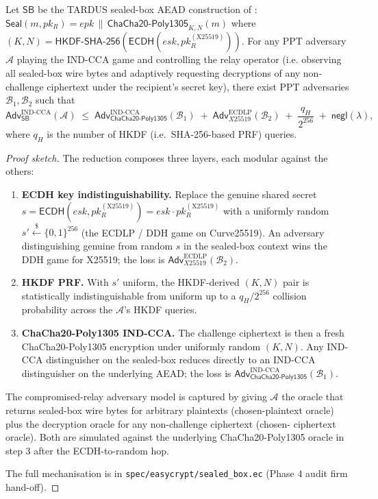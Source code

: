 \begin{theorem}
\label{thm:T7}
Let $\mathsf{SB}$ be the TARDUS sealed-box AEAD construction of
: $\mathsf{Seal}(m, pk_R) = epk \,\|\,
\mathsf{ChaCha20\text{-}Poly1305}_{K,N}(m)$ where
$(K,N) = \mathsf{HKDF\text{-}SHA\text{-}256}(\mathsf{ECDH}(esk, pk_R^{(\mathrm{X25519})}))$.
For any PPT adversary $\mathcal{A}$ playing the IND-CCA game and
controlling the relay operator (i.e. observing all sealed-box wire
bytes and adaptively requesting decryptions of any non-challenge
ciphertext under the recipient's secret key), there exist PPT
adversaries $\mathcal{B}_1, \mathcal{B}_2$ such that
\[
  \mathsf{Adv}^{\mathrm{IND\text{-}CCA}}_{\mathsf{SB}}(\mathcal{A}) \;\leq\;
  \mathsf{Adv}^{\mathrm{IND\text{-}CCA}}_{\mathsf{ChaCha20\text{-}Poly1305}}(\mathcal{B}_1) \;+\;
  \mathsf{Adv}^{\mathrm{ECDLP}}_{X25519}(\mathcal{B}_2) \;+\;
  \frac{q_H}{2^{256}} \;+\; \mathsf{negl}(\lambda),
\]
where $q_H$ is the number of HKDF (i.e.\ SHA-256-based PRF)
queries.
\end{theorem}

\begin{proof}[Proof sketch]
The reduction composes three layers, each modular against the
others:

\begin{enumerate}[leftmargin=2em,itemsep=0pt]
  \item \textbf{ECDH key indistinguishability.}
    Replace the genuine shared secret
    $s = \mathsf{ECDH}(esk, pk_R^{(\mathrm{X25519})}) = esk \cdot pk_R^{(\mathrm{X25519})}$
    with a uniformly random
    $s' \xleftarrow{\$} \{0,1\}^{256}$ (the ECDLP / DDH game on
    Curve25519). An adversary distinguishing genuine from random
    $s$ in the sealed-box context wins the DDH game for X25519;
    the loss is $\mathsf{Adv}^{\mathrm{ECDLP}}_{X25519}(\mathcal{B}_2)$.
  \item \textbf{HKDF PRF.}
    With $s'$ uniform, the HKDF-derived $(K, N)$ pair is
    statistically indistinguishable from uniform up to a
    $q_H / 2^{256}$ collision probability across the
    $\mathcal{A}$'s HKDF queries.
  \item \textbf{ChaCha20-Poly1305 IND-CCA.}
    The challenge ciphertext is then a fresh ChaCha20-Poly1305
    encryption under uniformly random $(K, N)$. Any IND-CCA
    distinguisher on the sealed-box reduces directly to an IND-CCA
    distinguisher on the underlying AEAD; the loss is
    $\mathsf{Adv}^{\mathrm{IND\text{-}CCA}}_{\mathsf{ChaCha20\text{-}Poly1305}}(\mathcal{B}_1)$.
\end{enumerate}

The compromised-relay adversary model is captured by giving
$\mathcal{A}$ the oracle that returns sealed-box wire bytes for
arbitrary plaintexts (chosen-plaintext oracle) plus the
decryption oracle for any non-challenge ciphertext (chosen-
ciphertext oracle). Both are simulated against the underlying
ChaCha20-Poly1305 oracle in step 3 after the ECDH-to-random hop.

The full mechanisation is in
\texttt{spec/easycrypt/sealed\_box.ec} (Phase 4 audit firm
hand-off).
\end{proof}

